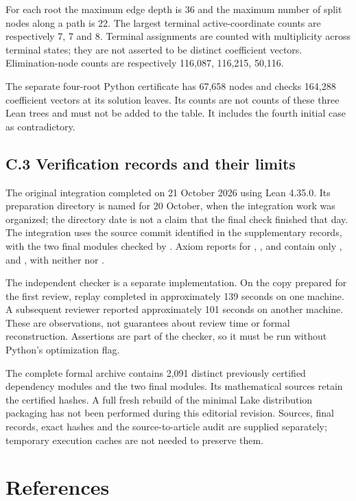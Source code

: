 \documentclass[pdflatex,sn-mathphys-num]{sn-jnl}
\begin{document}
For each root the maximum edge depth is 36 and the maximum number of split nodes along a path is 22. The largest terminal active-coordinate counts are respectively 7, 7 and 8. Terminal assignments are counted with multiplicity across terminal states; they are not asserted to be distinct coefficient vectors. Elimination-node counts are respectively 116,087, 116,215, 50,116.

The separate four-root Python certificate has 67,658 nodes and checks 164,288 coefficient vectors at its solution leaves. Its counts are not counts of these three Lean trees and must not be added to the table. It includes the fourth initial case as contradictory.

\subsection*{C.3 Verification records and their limits}

The original integration completed on 21 October 2026 using Lean 4.35.0. Its preparation directory is named for 20 October, when the integration work was organized; the directory date is not a claim that the final check finished that day. The integration uses the source commit identified in the supplementary records, with the two final modules checked by . Axiom reports for , ,  and  contain only ,  and , with neither  nor .

The independent checker is a separate implementation. On the copy prepared for the first review, replay completed in approximately 139 seconds on one machine. A subsequent reviewer reported approximately 101 seconds on another machine. These are observations, not guarantees about review time or formal reconstruction. Assertions are part of the checker, so it must be run without Python's optimization flag.

The complete formal archive contains 2,091 distinct previously certified dependency modules and the two final modules. Its mathematical sources retain the certified hashes. A full fresh rebuild of the minimal Lake distribution packaging has not been performed during this editorial revision. Sources, final records, exact hashes and the source-to-article audit are supplied separately; temporary execution caches are not needed to preserve them.

\section*{References}
\end{document}
